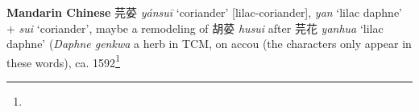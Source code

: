 \begin{etymology}\label{ety:yansui}
\textbf{Mandarin Chinese} {芫荽} \textit{yánsuī} `coriander' [lilac-coriander], \textit{yan} `lilac daphne' + \textit{sui} `coriander', maybe a remodeling of 胡荽 \textit{husui} after 芫花 \textit{yanhua} `lilac daphne' (\textit{Daphne genkwa} a herb in TCM, on accou (the characters only appear in these words), ca. 1592\footnote{}
\end{etymology}